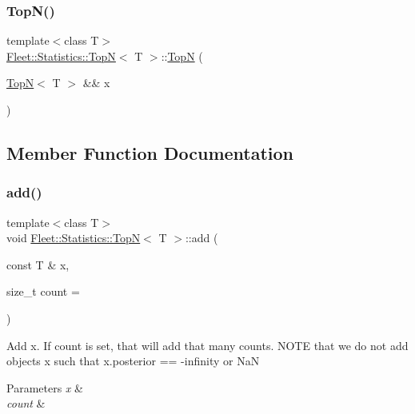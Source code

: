 \subsubsection{\texorpdfstring{Top\+N()}{TopN()}\hspace{0.1cm}{\footnotesize\ttfamily [3/3]}}
{\footnotesize\ttfamily template$<$class T$>$ \\
\hyperlink{class_fleet_1_1_statistics_1_1_top_n}{Fleet\+::\+Statistics\+::\+TopN}$<$ T $>$\+::\hyperlink{class_fleet_1_1_statistics_1_1_top_n}{TopN} (\begin{DoxyParamCaption}\item[{\hyperlink{class_fleet_1_1_statistics_1_1_top_n}{TopN}$<$ T $>$ \&\&}]{x }\end{DoxyParamCaption})\hspace{0.3cm}{\ttfamily [inline]}}



\subsection{Member Function Documentation}
\mbox{\label{class_fleet_1_1_statistics_1_1_top_n_a71f34724832a34c029bfeeb6e1dea24f}} 
\subsubsection{\texorpdfstring{add()}{add()}\hspace{0.1cm}{\footnotesize\ttfamily [1/2]}}
{\footnotesize\ttfamily template$<$class T$>$ \\
void \hyperlink{class_fleet_1_1_statistics_1_1_top_n}{Fleet\+::\+Statistics\+::\+TopN}$<$ T $>$\+::add (\begin{DoxyParamCaption}\item[{const T \&}]{x,  }\item[{size\+\_\+t}]{count = {} }\end{DoxyParamCaption})\hspace{0.3cm}{\ttfamily [inline]}}

Add x. If count is set, that will add that many counts. N\+O\+TE that we do not add objects x such that x.\+posterior == -\/infinity or NaN 
\begin{DoxyParams}{Parameters}
{\em x} & \\
\hline
{\em count} & \\
\hline
\end{DoxyParams}
\mbox{\label{class_fleet_1_1_statistics_1_1_top_n_ac1a720c5f52f0486377274bd1e6a052a}} 
